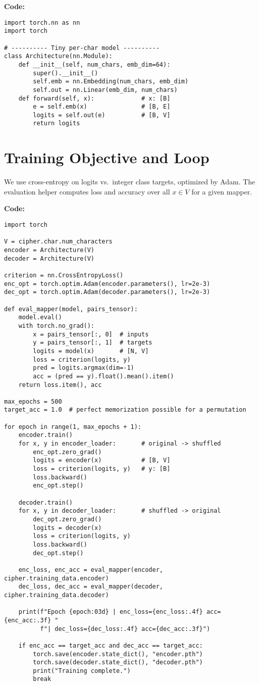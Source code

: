 \documentclass[12pt]{article}
\begin{document}
\noindent\textbf{Code:}
\begin{verbatim}
import torch.nn as nn
import torch

# ---------- Tiny per-char model ----------
class Architecture(nn.Module):
    def __init__(self, num_chars, emb_dim=64):
        super().__init__()
        self.emb = nn.Embedding(num_chars, emb_dim)
        self.out = nn.Linear(emb_dim, num_chars)
    def forward(self, x):             # x: [B]
        e = self.emb(x)               # [B, E]
        logits = self.out(e)          # [B, V]
        return logits
\end{verbatim}

\section{Training Objective and Loop}
We use cross-entropy on logits vs.\ integer class targets, optimized by Adam. 
The evaluation helper computes loss and accuracy over all $x\in V$ for a given mapper.

\noindent\textbf{Code:}
\begin{verbatim}
import torch

V = cipher.char.num_characters
encoder = Architecture(V)
decoder = Architecture(V)

criterion = nn.CrossEntropyLoss()
enc_opt = torch.optim.Adam(encoder.parameters(), lr=2e-3)
dec_opt = torch.optim.Adam(decoder.parameters(), lr=2e-3)

def eval_mapper(model, pairs_tensor):
    model.eval()
    with torch.no_grad():
        x = pairs_tensor[:, 0]  # inputs
        y = pairs_tensor[:, 1]  # targets
        logits = model(x)       # [N, V]
        loss = criterion(logits, y)
        pred = logits.argmax(dim=-1)
        acc = (pred == y).float().mean().item()
    return loss.item(), acc

max_epochs = 500
target_acc = 1.0  # perfect memorization possible for a permutation

for epoch in range(1, max_epochs + 1):
    encoder.train()
    for x, y in encoder_loader:       # original -> shuffled
        enc_opt.zero_grad()
        logits = encoder(x)           # [B, V]
        loss = criterion(logits, y)   # y: [B]
        loss.backward()
        enc_opt.step()

    decoder.train()
    for x, y in decoder_loader:       # shuffled -> original
        dec_opt.zero_grad()
        logits = decoder(x)
        loss = criterion(logits, y)
        loss.backward()
        dec_opt.step()

    enc_loss, enc_acc = eval_mapper(encoder, cipher.training_data.encoder)
    dec_loss, dec_acc = eval_mapper(decoder, cipher.training_data.decoder)

    print(f"Epoch {epoch:03d} | enc_loss={enc_loss:.4f} acc={enc_acc:.3f} "
          f"| dec_loss={dec_loss:.4f} acc={dec_acc:.3f}")

    if enc_acc == target_acc and dec_acc == target_acc:
        torch.save(encoder.state_dict(), "encoder.pth")
        torch.save(decoder.state_dict(), "decoder.pth")
        print("Training complete.")
        break
\end{verbatim}
\end{document}
